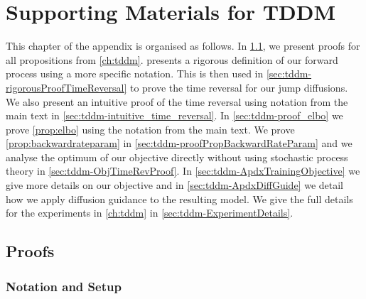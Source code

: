 \chapter{Supporting Materials for TDDM}


This chapter of the appendix is organised as follows.  In \cref{sec:tddm-Proofs}, we present proofs for all propositions from \cref{ch:tddm}.  presents a rigorous definition of our forward process using a more specific notation. This is then used in \cref{sec:tddm-rigorousProofTimeReversal} to prove the time reversal for our jump diffusions. We also present an intuitive proof of the time reversal using notation from the main text in \cref{sec:tddm-intuitive_time_reversal}. In \cref{sec:tddm-proof_elbo} we prove \cref{prop:elbo} using the notation from the main text. We prove \cref{prop:backwardrateparam} in \cref{sec:tddm-proofPropBackwardRateParam} and we analyse the optimum of our objective directly without using stochastic process theory in \cref{sec:tddm-ObjTimeRevProof}. In \cref{sec:tddm-ApdxTrainingObjective} we give more details on our objective and in \cref{sec:tddm-ApdxDiffGuide} we detail how we apply diffusion guidance to the resulting model. We give the full details for the experiments in \cref{ch:tddm} in \cref{sec:tddm-ExperimentDetails}.

\section{Proofs}
\label{sec:tddm-Proofs}

\subsection{Notation and Setup}
\label{sec:tddm-notation}

\def \msb {\mathsf{B}}
\def \Jbb{\mathbb{J}}
\def \Pbb{\mathbb{P}}
\def \Kbb{\mathbb{K}}
\def \rmd{\mathrm{d}}
\def \msp{\mathsf{P}}
\def \Jker{\mathbb{J}}
\def \msd{\mathsf{D}}
\def \calR{\mathcal{R}}
\def \rset{\mathbb{R}}
\def \msx{\mathsf{X}}
\def \mcx{\mathcal{X}}
\def \nset{\mathbb{N}}
\def \dim{\mathrm{dim}}
\def \rmc{\mathrm{C}}
\def \bfX{\mathbf{X}}
\def \bfY{\mathbf{Y}}
\def \Pker{\mathrm{P}}
\def \Qker{\mathrm{Q}}
\def \Jker{\mathrm{J}}
\def \msa{\mathsf{A}}

